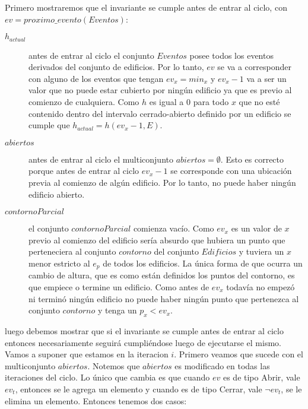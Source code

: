 Primero mostraremos que el invariante se cumple antes de entrar al ciclo, con $ev = proximo\_evento(Eventos)$:
\begin{description}
	\item[$h_{actual}$] antes de entrar al ciclo el conjunto $Eventos$ posee todos los eventos derivados
	del conjunto de edificios. Por lo tanto, $ev$ se va a corresponder con alguno de los eventos que 
	tengan $ev_x = min_x$ y $ev_x - 1$ va a ser un valor que no puede estar cubierto por ningún edificio
	ya que es previo al comienzo de cualquiera. Como $h$ es igual a 0 para todo $x$ que no esté contenido
	dentro del intervalo cerrado-abierto definido por un edificio se cumple que $h_{actual} = h(ev_x - 1, E)$.
	
	\item[$abiertos$] antes de entrar al ciclo el multiconjunto $abiertos = \emptyset$. Esto es correcto porque antes de
	entrar al ciclo $ev_x - 1$ se corresponde con una ubicación previa al comienzo de algún edificio. Por lo tanto,
	no puede haber ningún edificio abierto.
	
	\item[$contornoParcial$] el conjunto $contornoParcial$ comienza vacío. Como $ev_x$ es un valor de $x$ previo al comienzo del edificio
	sería absurdo que hubiera un punto que perteneciera al conjunto $contorno$ del conjunto $Edificios$ y tuviera
	un $x$ menor estricto al $e_p$ de todos los edificios. La única forma de que ocurra un cambio de altura, que es
	como están definidos los puntos del contorno, es que empiece o termine un edificio. Como antes de $ev_x$ todavía 
	no empezó ni terminó ningún edificio no puede haber ningún punto que pertenezca al conjunto $contorno$ y 
	tenga un $p_x < ev_x$.
\end{description}
luego debemos mostrar que si el invariante se cumple antes de entrar al ciclo entonces necesariamente seguirá 
cumpliéndose luego de ejecutarse el mismo. Vamos a suponer que estamos en la iteracion $i$. 
Primero veamos que sucede con el multiconjunto $abiertos$. Notemos que
$abiertos$ es modificado en todas las iteraciones del ciclo. Lo único que cambia es que cuando $ev$ es de tipo
Abrir, vale $ev_t$, entonces se le agrega un elemento y cuando es de tipo Cerrar, vale $\neg ev_t$, se le elimina un elemento. 
Entonces tenemos dos casos:
